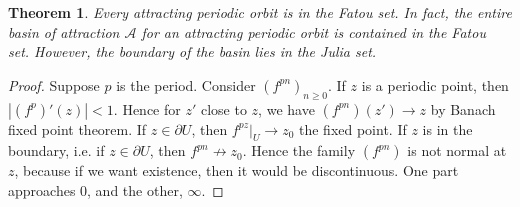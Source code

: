 \documentclass[a4paper, 11pt]{book}
\newtheorem{theorem}{Theorem}
\theoremstyle{definition}
\theoremstyle{remark}
\begin{document}
    \begin{theorem}
        Every attracting periodic orbit is in the Fatou set. In fact, the entire basin of attraction
        $\mathcal{A}$ for an attracting periodic orbit is contained in the Fatou set. However, the boundary of the
        basin lies in the Julia set.
    \end{theorem}

    \begin{proof}
        Suppose $p$ is the period. Consider $(f^{pn})_{n\geq 0}$. If $z$ is a periodic point, then $|(f^p)'(z)|<1$. Hence
        for $z'$ close to $z$, we have $(f^{pn})(z')\to z$ by Banach fixed point theorem.
        If $z\in\partial{U}$, then $f^{pz}|_U\to z_0$ the fixed point. If $z$ is in the boundary, i.e. if $z\in\partial{U}$, then
        $f^{pn}\not\to z_0$. Hence the family $(f^{pn})$ is not normal at $z$, because if we want existence, then it would be
        discontinuous. One part approaches 0, and the other, $\infty$.
    \end{proof}
    
\end{document}
